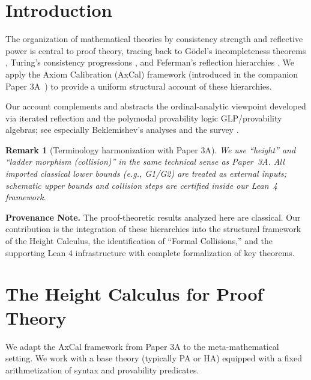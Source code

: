 \documentclass[11pt]{article}
\newtheorem{remark}[theorem]{Remark}
\begin{document}
\tableofcontents

\section{Introduction}

The organization of mathematical theories by consistency strength and reflective power is central to proof theory, tracing back to Gödel's incompleteness theorems \cite{Godel1931}, Turing's consistency progressions \cite{Turing1939}, and Feferman's reflection hierarchies \cite{Feferman1962}. We apply the Axiom Calibration (AxCal) framework (introduced in the companion Paper 3A~\cite{LeeAxCal2025}) to provide a uniform structural account of these hierarchies.

Our account complements and abstracts the ordinal-analytic viewpoint developed via iterated reflection and the polymodal provability logic GLP/provability algebras; see especially Beklemishev's analyses \cite{Beklemishev2003,Beklemishev2004} and the survey \cite{ArtemovBeklemishev2004}.

\begin{remark}[Terminology harmonization with Paper 3A]
We use ``height'' and ``ladder morphism (collision)'' in the same technical sense as Paper~3A. All imported classical lower bounds (e.g., G1/G2) are treated as external inputs; schematic upper bounds and collision steps are certified inside our Lean~4 framework.
\end{remark}

\begin{mdframed}[style=provenance]
\textbf{Provenance Note.} The proof-theoretic results analyzed here are classical. Our contribution is the integration of these hierarchies into the structural framework of the Height Calculus, the identification of ``Formal Collisions,'' and the supporting Lean 4 infrastructure with complete formalization of key theorems.
\end{mdframed}

\section{The Height Calculus for Proof Theory}

We adapt the AxCal framework from Paper 3A to the meta-mathematical setting. We work with a base theory (typically PA or HA) equipped with a fixed arithmetization of syntax and provability predicates.
\end{document}
